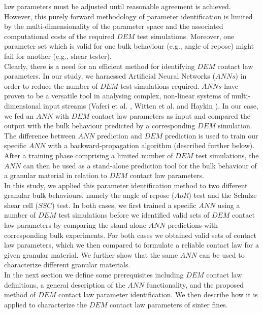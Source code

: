 \documentclass{llncs}
\begin{document}
law parameters must be adjusted until reasonable agreement is achieved.\\
However, this purely forward methodology of parameter identification is limited by 
the multi-dimensionality of the parameter space and the associated computational costs of the required 
$DEM$ test simulations. 
Moreover, one parameter set which is valid for one bulk behaviour (e.g., angle
of repose) might fail for another (e.g., shear tester). \\
Clearly, there is a need for an efficient method for identifying
$DEM$ contact law parameters.
In our study, we harnessed Artificial Neural Networks ($ANNs$) in order to
reduce the number of $DEM$ test simulations required. 
$ANNs$ have proven to be a versatile tool in analysing complex, non-linear
systems of multi-dimensional input streams (Vaferi et al. \cite{RefWorks:150}, Witten et
al. \cite{RefWorks:174} and Haykin \cite{RefWorks:158}).
In our case, we fed an $ANN$ with $DEM$ contact law parameters as input
and compared the output with the bulk behaviour 
predicted by a corresponding $DEM$ simulation. 
The difference between $ANN$ prediction and $DEM$ prediction is used to train our 
specific $ANN$ with a backward-propagation algorithm (described further below). 
After a training phase comprising a limited number of $DEM$ test simulations,
the $ANN$ can then be used as a stand-alone prediction tool for the bulk behaviour of a 
granular material in relation to $DEM$ contact law parameters. \\
In this study, we applied this parameter identification method to two different
granular bulk behaviours, namely the angle of repose ($AoR$) test and the
Schulze shear cell ($SSC$) test.
In both cases, we first trained a specific $ANN$ using a number of $DEM$ test
simulations before we identified valid sets of $DEM$ contact law parameters by
comparing the stand-alone $ANN$ predictions with corresponding bulk experiments. 
For both cases we obtained valid sets of contact law parameters, 
which we then compared to formulate a reliable contact law for a given
granular material.
We further show that the same $ANN$ can be used to characterize different granular materials. \\
In the next section we define some prerequisites including $DEM$ contact law
definitions, a general description of the $ANN$ functionality, and the proposed
method of $DEM$ contact law parameter identification.
We then describe how it is applied to characterize the $DEM$ contact law
parameters of sinter fines.
\end{document}

